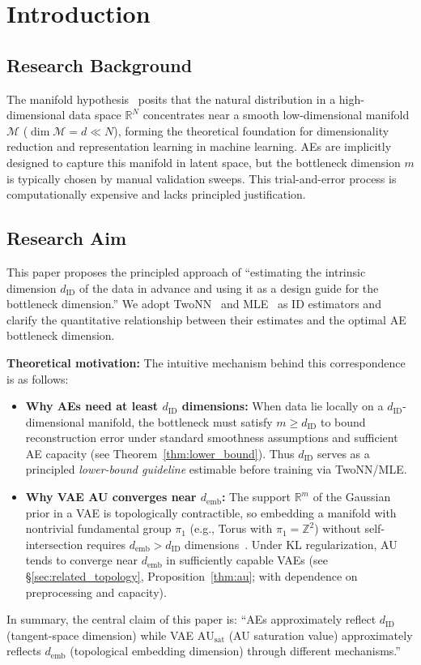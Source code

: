 \documentclass[12pt,a4paper]{article}
\newcommand{\dID}{d_{\mathrm{ID}}}
\newcommand{\dz}{m}
\newcommand{\R}{\mathbb{R}}
\newcommand{\AUsat}{\mathrm{AU}_{\mathrm{sat}}}
\newcommand{\demb}{d_{\mathrm{emb}}}
\begin{document}
\section{Introduction}\label{sec:intro}

\subsection{Research Background}\label{sec:intro_bg}

The manifold hypothesis~\cite{fefferman2016manifold,bengio2013representation}
posits that the natural distribution in a high-dimensional data space $\R^N$
concentrates near a smooth low-dimensional manifold $\mathcal{M}$
($\dim\mathcal{M} = d \ll N$),
forming the theoretical foundation for dimensionality reduction and representation learning in machine learning.
AEs are implicitly designed to capture this manifold in latent space,
but the bottleneck dimension $\dz$ is typically chosen by manual validation sweeps.
This trial-and-error process is computationally expensive and lacks principled justification.

\subsection{Research Aim}\label{sec:intro_aim}

This paper proposes the principled approach of
``estimating the intrinsic dimension $\dID$ of the data in advance and using it as a design guide for the bottleneck dimension.''
We adopt TwoNN~\cite{facco2017twonn} and MLE~\cite{levina2005mle} as ID estimators
and clarify the quantitative relationship between their estimates and the optimal AE bottleneck dimension.

\textbf{Theoretical motivation:}
The intuitive mechanism behind this correspondence is as follows:
\begin{itemize}
  \item \textbf{Why AEs need at least $\dID$ dimensions:}
    When data lie locally on a $\dID$-dimensional manifold,
    the bottleneck must satisfy $m \geq \dID$ to bound reconstruction error
    under standard smoothness assumptions and sufficient AE capacity
    (see Theorem~\ref{thm:lower_bound}).
    Thus $\dID$ serves as a principled \emph{lower-bound guideline} estimable before training via TwoNN/MLE.
  \item \textbf{Why VAE AU converges near $\demb$:}
    The support $\R^m$ of the Gaussian prior in a VAE is topologically contractible,
    so embedding a manifold with nontrivial fundamental group $\pi_1$
    (e.g., Torus with $\pi_1 = \mathbb{Z}^2$) without self-intersection
    requires $\demb > \dID$ dimensions~\cite{hatcher2002algebraic}.
    Under KL regularization, AU tends to converge near $\demb$ in sufficiently capable VAEs
    (see \S\ref{sec:related_topology}, Proposition~\ref{thm:au};
    with dependence on preprocessing and capacity).
\end{itemize}
In summary, the central claim of this paper is:
``AEs approximately reflect $\dID$ (tangent-space dimension) while VAE $\AUsat$ (AU saturation value) approximately reflects $\demb$ (topological embedding dimension) through different mechanisms.''
\end{document}

